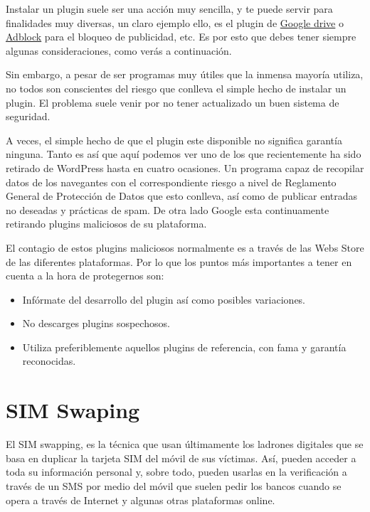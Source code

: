 \documentclass[
  spanish,
  a4paper,
  openany]{book}
\begin{document}
Instalar un plugin suele ser una acción muy sencilla, y te puede servir para finalidades muy diversas, un claro ejemplo ello, es el plugin de \href{https://drive.googleblog.com/2012/12/introducing-save-to-drive-extension.html}{Google drive} o \href{https://getadblock.com/}{Adblock} para el bloqueo de publicidad, etc. Es por esto que debes tener siempre algunas consideraciones, como verás a continuación.

Sin embargo, a pesar de ser programas muy útiles que la inmensa mayoría utiliza, no todos son conscientes del riesgo que conlleva el simple hecho de instalar un plugin. El problema suele venir por no tener actualizado un buen sistema de seguridad.

A veces, el simple hecho de que el plugin este disponible no significa garantía ninguna. Tanto es así que aquí podemos ver uno de los que recientemente ha sido retirado de WordPress hasta en cuatro ocasiones. Un programa capaz de recopilar datos de los navegantes con el correspondiente riesgo a nivel de Reglamento General de Protección de Datos que esto conlleva, así como de publicar entradas no deseadas y prácticas de spam. De otra lado Google esta continuamente retirando plugins maliciosos de su plataforma.

El contagio de estos plugins maliciosos normalmente es a través de las Webs Store de las diferentes plataformas. Por lo que los puntos más importantes a tener en cuenta a la hora de protegernos son:

\begin{itemize}
\item
  Infórmate del desarrollo del plugin así como posibles variaciones.
\item
  No descarges plugins sospechosos.
\item
  Utiliza preferiblemente aquellos plugins de referencia, con fama y garantía reconocidas.
\end{itemize}

\hypertarget{sim-swaping}{%
\section{SIM Swaping}\label{sim-swaping}}

El SIM swapping, es la técnica que usan últimamente los ladrones digitales que se basa en duplicar la tarjeta SIM del móvil de sus víctimas. Así, pueden acceder a toda su información personal y, sobre todo, pueden usarlas en la verificación a través de un SMS por medio del móvil que suelen pedir los bancos cuando se opera a través de Internet y algunas otras plataformas online.
\end{document}
